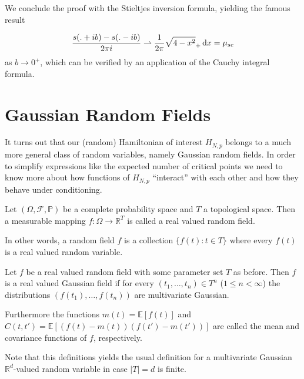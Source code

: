 We conclude the proof with the Stieltjes inversion formula, yielding the famous result

$$\frac{s(.+ib)-s(.-ib)}{2\pi i}\rightharpoonup\frac{1}{2\pi}\sqrt{4-x^2}_+\mathop{}\!\mathrm{d} x=\mu_{sc}$$
as $b\rightarrow 0^+$, which can be verified by an application of the Cauchy integral formula.









\section{Gaussian Random Fields}\label{sec:GRF}
It turns out that our (random) Hamiltonian of interest $H_{N,p}$ belongs to a much more general class of random variables, namely Gaussian random fields. In order to simplify expressions like the expected number of critical points we need to know more about how functions of $H_{N,p}$ ``interact'' with each other and how they behave under conditioning.

\begin{definition}
	Let $(\Omega,\mathcal F, \mathbb P)$ be a complete probability space and $T$ a topological space. Then a measurable mapping $f:\Omega\rightarrow\mathbb R^T$ is called a real valued random field.
	
\end{definition}

In other words, a random field $f$ is a collection $\{f(t):t\in T\}$ where every $f(t)$ is a real valued random variable.

\begin{definition}
	Let $f$ be a real valued random field with some parameter set $T$ as before. Then $f$ is a real valued Gaussian field if for every $(t_1,\dots,t_n)\in T^n$ ($1\leq n <\infty$) the distributions $(f(t_1),\dots,f(t_n))$ are multivariate Gaussian.
	
	Furthermore the functions $m(t)=\mathbb E[f(t)]$ and \newline$C(t,t')=\mathbb E[(f(t)-m(t))(f(t')-m(t'))]$ are called the mean and covariance functions of $f$, respectively.
\end{definition}
Note that this definitions yields the usual definition for a multivariate Gaussian $\mathbb R^d$-valued random variable in case $|T|=d$ is finite.

